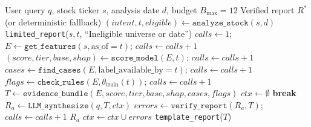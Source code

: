 \documentclass[conference]{IEEEtran}
\begin{document}
\begin{algorithm}[t]
\caption{Multibagger Scout Agent \& 3-Round Verification}
\label{alg:agent}
\scriptsize
\begin{algorithmic}[1]
\Require User query $q$, stock ticker $s$, analysis date $d$, budget $B_{\max}{=}12$
\Ensure Verified report $R^*$ (or deterministic fallback)
\State $(intent, t, eligible) \gets \texttt{analyze\_stock}(s, d)$ 
    \State \Return \texttt{limited\_report}($s, t$, ``Ineligible universe or date'')
\EndIf
\State $calls \gets 1$;\; $E \gets \texttt{get\_features}(s, \text{as\_of}{=}t)$;\; $calls \gets calls + 1$
\State $(score, tier, base, shap) \gets \texttt{score\_model}(E, t)$;\; $calls \gets calls + 1$
\State $cases \gets \texttt{find\_cases}(E, \text{label\_available\_by}{=}t)$;\; $calls \gets calls + 1$
\State $flags \gets \texttt{check\_rules}(E, \theta_{\text{train}}(t))$;\; $calls \gets calls + 1$
\State $T \gets \texttt{evidence\_bundle}(E, score, tier, base, shap, cases, flags)$
\State $ctx \gets \emptyset$
     \textbf{break} \EndIf
    \State $R_a \gets \texttt{LLM\_synthesize}(q, T, ctx)$ 
    \State $errors \gets \texttt{verify\_report}(R_a, T)$;\; $calls \gets calls + 1$
        \State \Return $R_a$ 
    \EndIf
    \State $ctx \gets ctx \cup errors$ 
\EndFor
\State \Return \texttt{template\_report}($T$) 
\end{algorithmic}
\end{algorithm}
\end{document}
